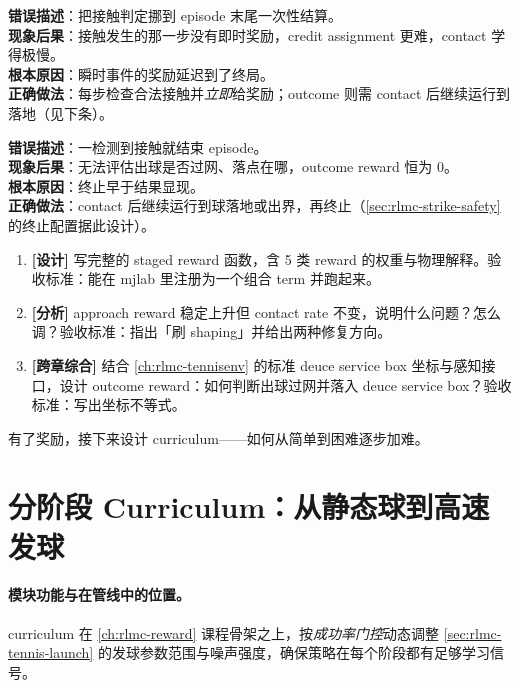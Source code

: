 \begin{pitfall}
\textbf{错误描述}：把接触判定挪到 episode 末尾一次性结算。\\
\textbf{现象后果}：接触发生的那一步没有即时奖励，credit assignment 更难，contact 学得极慢。\\
\textbf{根本原因}：瞬时事件的奖励延迟到了终局。\\
\textbf{正确做法}：每步检查合法接触并\emph{立即}给奖励；outcome 则需 contact 后继续运行到落地（见下条）。
\end{pitfall}

\begin{pitfall}
\textbf{错误描述}：一检测到接触就结束 episode。\\
\textbf{现象后果}：无法评估出球是否过网、落点在哪，outcome reward 恒为 0。\\
\textbf{根本原因}：终止早于结果显现。\\
\textbf{正确做法}：contact 后继续运行到球落地或出界，再终止（\cref{sec:rlmc-strike-safety} 的终止配置据此设计）。
\end{pitfall}

\begin{practice}[本节动手任务]
\begin{enumerate}
  \item \textbf{[设计]} 写完整的 staged reward 函数，含 5 类 reward 的权重与物理解释。验收标准：能在 mjlab 里注册为一个组合 term 并跑起来。
  \item \textbf{[分析]} approach reward 稳定上升但 contact rate 不变，说明什么问题？怎么调？验收标准：指出「刷 shaping」并给出两种修复方向。
  \item \textbf{[跨章综合]} 结合 \cref{ch:rlmc-tennisenv} 的标准 deuce service box 坐标与感知接口，设计 outcome reward：如何判断出球过网并落入 deuce service box？验收标准：写出坐标不等式。
\end{enumerate}
\end{practice}

\noindent{}有了奖励，接下来设计 curriculum——如何从简单到困难逐步加难。

\section{分阶段 Curriculum：从静态球到高速发球}
\label{sec:rlmc-strike-curriculum}

\paragraph{模块功能与在管线中的位置。}curriculum 在 \cref{ch:rlmc-reward} 课程骨架之上，按\emph{成功率门控}动态调整 \cref{sec:rlmc-tennis-launch} 的发球参数范围与噪声强度，确保策略在每个阶段都有足够学习信号。

